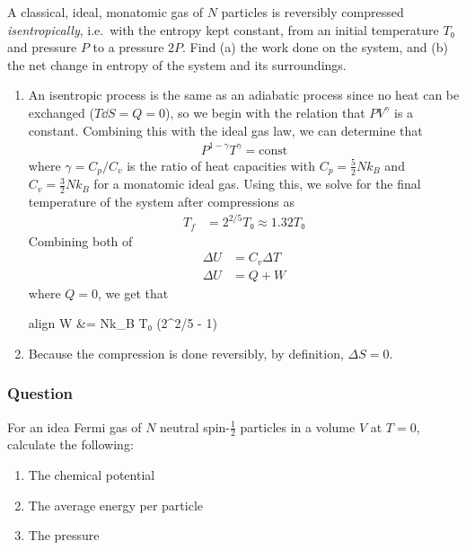 A classical, ideal, monatomic gas of $N$ particles is reversibly compressed
\emph{isentropically}, i.e.~with the entropy kept constant, from an initial
temperature $T₀$ and pressure $P$ to a pressure $2P$. Find (a) the work done
on the system, and (b) the net change in entropy of the system and its
surroundings.

\begin{enumerate}
	\item
		An isentropic process is the same as an adiabatic process since no
		heat can be exchanged ($T\dd S = Q = 0$), so we begin with the relation
		that $PV^{γ}$ is a constant. Combining this with the ideal gas law,
		we can determine that
		\begin{align*}
			P^{1-γ}T^{γ} = \mathrm{const}
		\end{align*}
		where $γ = C_p/C_v$ is the ratio of heat capacities with $C_p =
		\frac 52 Nk_B$ and $C_v = \frac 32 Nk_B$ for a monatomic ideal gas.
		Using this, we solve for the final temperature of the system after
		compressions as
		\begin{align*}
			T_f &= 2^{2/5} T₀ ≈ 1.32T₀
		\end{align*}
		Combining both of
		\begin{align*}
			ΔU &= C_v ΔT \\
			ΔU &= Q + W
		\end{align*}
		where $Q = 0$, we get that
		\begin{empheq}[box=\fbox]{align}
			W &=  Nk_B T₀ (2^{2/5} - 1)
		\end{empheq}
	\item
		Because the compression is done reversibly, by definition, $ΔS = 0$.
\end{enumerate}

\subsubsection{Question}

For an idea Fermi gas of $N$ neutral spin-$\frac 12$ particles in a volume
$V$ at $T = 0$, calculate the following:
\begin{enumerate}
	\item The chemical potential
	\item The average energy per particle
	\item The pressure
\end{enumerate}

